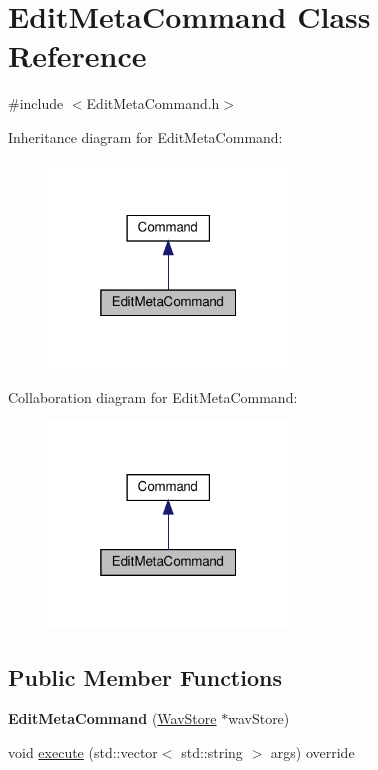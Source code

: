 \hypertarget{classEditMetaCommand}{}\section{Edit\+Meta\+Command Class Reference}
\label{classEditMetaCommand}


{\ttfamily \#include $<$Edit\+Meta\+Command.\+h$>$}



Inheritance diagram for Edit\+Meta\+Command\+:
\nopagebreak
\begin{figure}[H]
\begin{center}
\leavevmode
\includegraphics[width=181pt]{d9/da2/classEditMetaCommand__inherit__graph}
\end{center}
\end{figure}


Collaboration diagram for Edit\+Meta\+Command\+:
\nopagebreak
\begin{figure}[H]
\begin{center}
\leavevmode
\includegraphics[width=181pt]{d8/db7/classEditMetaCommand__coll__graph}
\end{center}
\end{figure}
\subsection*{Public Member Functions}
\begin{DoxyCompactItemize}
\item 
\mbox{\label{classEditMetaCommand_a1d1216017cad44cea224881c55163854}} 
{\bfseries Edit\+Meta\+Command} (\hyperlink{classWavStore}{Wav\+Store} $\ast$wav\+Store)
\item 
void \hyperlink{classEditMetaCommand_ae96350ba54b8e3f4f84dcb8eab8da522}{execute} (std\+::vector$<$ std\+::string $>$ args) override
\end{DoxyCompactItemize}


